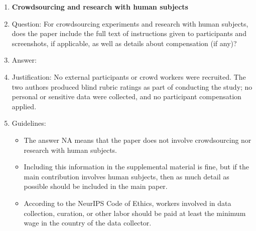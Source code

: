 \begin{enumerate}
\item {\bf Crowdsourcing and research with human subjects}
    \item[] Question: For crowdsourcing experiments and research with human subjects, does the paper include the full text of instructions given to participants and screenshots, if applicable, as well as details about compensation (if any)?
    \item[] Answer: \answerNA{}
    \item[] Justification: No external participants or crowd workers were recruited. The two authors produced blind rubric ratings as part of conducting the study; no personal or sensitive data were collected, and no participant compensation applied.
    \item[] Guidelines:
    \begin{itemize}
        \item The answer NA means that the paper does not involve crowdsourcing nor research with human subjects.
        \item Including this information in the supplemental material is fine, but if the main contribution involves human subjects, then as much detail as possible should be included in the main paper.
        \item According to the NeurIPS Code of Ethics, workers involved in data collection, curation, or other labor should be paid at least the minimum wage in the country of the data collector.
    \end{itemize}


\end{enumerate}

